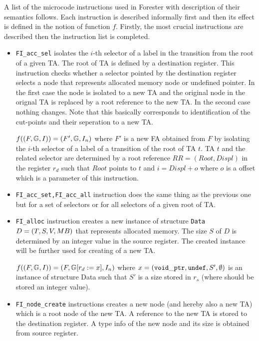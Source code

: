 A list of the microcode instructions used in Forester with description
of their semantics follows.
Each instruction is described informally first and then its effect is defined
in the notion of function $f$.
Firstly, the most crucial instructions are described then the instruction list is completed.
\begin{itemize}
	\item {\tt FI\_acc\_sel} isolates the $i$-th selector of a label
		in the transition from the root of a given TA.
		The root of TA is defined by a destination register.
		This instruction checks whether a selector pointed by the destination register
		selects a node that represents allocated memory node or undefined pointer.
		In the first case the node is isolated to a new TA and the original node in the
		orignal TA is replaced by a root reference to the new TA.
		In the second case nothing changes.
		Note that this basically corresponds to identification of the cut-points
		and their seperation to a new TA.
		
		$f((F, \mathbb{G}, I)) = (F', \mathbb{G}, I_n)$
		where $F'$ is a new FA obtained from $F$ by isolating
		the $i$-th selector of a label of a transition of the root of TA $t$.
		TA $t$ and the related selector are determined by a root reference $RR=(Root, Displ)$
		in the register $r_d$ such that $Root$ points to $t$ and $i=Displ+o$
		where $o$ is a offset which is a parameter of this instruction.

	\item {\tt FI\_acc\_set,FI\_acc\_all} instruction does the same thing as the previous one
		but for a set of selectors or for all selectors of a given root of TA.

	\item {\tt FI\_alloc} instruction creates a new instance of structure {\tt Data} $D = (T,S,V,MB)$
		that represents allocated memory.
		The size $S$ of $D$ is determined by an integer value in the source register.
		The created instance will be further used for creating of a new TA.
		
		$f((F, \mathbb{G}, I)) = (F, 
		\mathbb{G} [
			r_{d} := x], I_n)$
		where $x=({\tt void\_ptr},{\tt undef},S',\emptyset)$ is an instance of structure Data
		such that $S'$ is a size stored in $r_s$ (where should be stored an integer value). 
	
	\item {\tt FI\_node\_create} instructions creates a new node
		(and hereby also a new TA) which is a root node of the new TA.
		A reference to the new TA is stored to the destination register.
		A type info of the new node and its size is obtained from source
		register.
		

\end{itemize}
